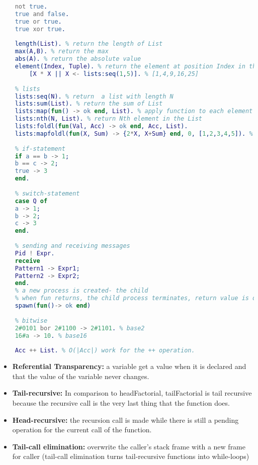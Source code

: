 \documentclass[../main.tex]{subfiles}
\begin{document}
\begin{lstlisting}[language=erlang]
    % boolean expressions
    not true.
    true and false.
    true or true.
    true xor true.
    
    length(List). % return the length of List
    max(A,B). % return the max
    abs(A). % return the absolute value
    element(Index, Tuple). % return the element at position Index in the Tuple
    	[X * X || X <- lists:seq(1,5)]. % [1,4,9,16,25]
    
    % lists
    lists:seq(N). % return  a list with length N
    lists:sum(List). % return the sum of List
    lists:map(fun() -> ok end, List). % apply function to each element in the List
    lists:nth(N, List). % return Nth element in the List
    lists:foldl(fun(Val, Acc) -> ok end, Acc, List).
    lists:mapfoldl(fun(X, Sum) -> {2*X, X+Sum} end, 0, [1,2,3,4,5]). % {[2,4,6,8,10],15}
    
    % if-statement
    if a == b -> 1;
    b == c -> 2;
    true -> 3
    end.
    
    % switch-statement
    case Q of
    a -> 1;
    b -> 2;
    c -> 3
    end.
    
    % sending and receiving messages
    Pid ! Expr.
    receive
    Pattern1 -> Expr1;
    Pattern2 -> Expr2;
    end.
    % a new process is created- the child
    % when fun returns, the child process terminates, return value is discarded.
    spawn(fun()-> ok end)
    
    % bitwise
    2#0101 bor 2#1100 -> 2#1101. % base2
    16#a -> 10. % base16
    
    Acc ++ List. % O(|Acc|) work for the ++ operation.
\end{lstlisting}


\begin{itemize}
	\item \textbf{Referential Transparency:} a variable get a value when it is declared and that the value of the variable never changes.
    \item \textbf{Tail-recursive:} In comparison to headFactorial, tailFactorial is tail recursive because the recursive call is the very last thing that the function does.
    \item \textbf{Head-recursive:} the recursion call is made while there is still a pending operation for the current call of the function.
	\item \textbf{Tail-call elimination:} overwrite the caller’s stack frame with a new frame for caller (tail-call elimination turns tail-recursive functions into while-loops)
\end{itemize}
\end{document}
